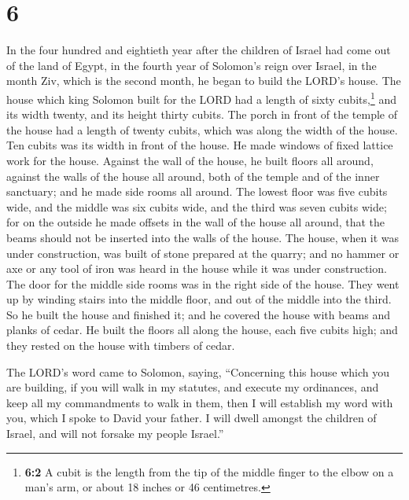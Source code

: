 \hypertarget{section-5}{%
\section{6}\label{section-5}}

 In the four hundred and eightieth year after the children
of Israel had come out of the land of Egypt, in the fourth year of
Solomon's reign over Israel, in the month Ziv, which is the second
month, he began to build the LORD's house.  The house
which king Solomon built for the LORD had a length of sixty
cubits,\footnote{\textbf{6:2} A cubit is the length from the tip of the
  middle finger to the elbow on a man's arm, or about 18 inches or 46
  centimetres.} and its width twenty, and its height thirty cubits.
 The porch in front of the temple of the house had a
length of twenty cubits, which was along the width of the house. Ten
cubits was its width in front of the house.  He made
windows of fixed lattice work for the house.  Against the
wall of the house, he built floors all around, against the walls of the
house all around, both of the temple and of the inner sanctuary; and he
made side rooms all around.  The lowest floor was five
cubits wide, and the middle was six cubits wide, and the third was seven
cubits wide; for on the outside he made offsets in the wall of the house
all around, that the beams should not be inserted into the walls of the
house.  The house, when it was under construction, was
built of stone prepared at the quarry; and no hammer or axe or any tool
of iron was heard in the house while it was under construction.
 The door for the middle side rooms was in the right side
of the house. They went up by winding stairs into the middle floor, and
out of the middle into the third.  So he built the house
and finished it; and he covered the house with beams and planks of
cedar.  He built the floors all along the house, each
five cubits high; and they rested on the house with timbers of cedar.

 The LORD's word came to Solomon, saying, 
``Concerning this house which you are building, if you will walk in my
statutes, and execute my ordinances, and keep all my commandments to
walk in them, then I will establish my word with you, which I spoke to
David your father.  I will dwell amongst the children of
Israel, and will not forsake my people Israel.''

